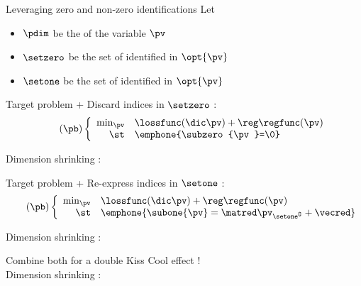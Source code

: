 \begin{frame}{Leveraging zero and non-zero identifications}
  Let
  \begin{itemize}
    \item $\pdim$ be the  of the variable $\pv$
    \pause
    \item $\setzero$ be the set of  identified in $\opt{\pv}$ 
    \pause
    \item $\setone$ be the set of  identified in $\opt{\pv}$ 
  \end{itemize}
  \pause
  \begin{minipage}{0.49\linewidth}
    \begin{block}{Target problem + \emphone{$\setzero$}}
      Discard indices in $\setzero$ :
      \begin{equation}
        \label{prob:convex-sparse-problem-zero}
        \tag{$\pb$}
        \left\{
          \begin{array}{rl}
            \min_{\pv} & \lossfunc(\dic\pv) + \reg\regfunc(\pv) \\
            \text{\st} & \emphone{\subzero{\pv}=\0}
          \end{array}
        \right.
      \end{equation}
      \pause
      \begin{center}
        Dimension shrinking : \emphone{$\pdim \rightarrow \pdim - \card{\setzero}$}
      \end{center}
    \end{block}
  \end{minipage}
  \pause
  \begin{minipage}{0.49\linewidth}
    \begin{block}{Target problem + \emphone{$\setone$}}
      Re-express indices in $\setone$ :
      \begin{equation}
        \label{prob:convex-sparse-problem-nonzero}
        \tag{$\pb$}
        \left\{
          \begin{array}{rl}
            \min_{\pv} & \lossfunc(\dic\pv) + \reg\regfunc(\pv) \\
            \text{\st} & \emphone{\subone{\pv}=\matred\pv_{\setone^\complement} + \vecred}
          \end{array}
        \right.
      \end{equation}
      \pause
      \begin{center}
        Dimension shrinking : \emphone{$\pdim \rightarrow \pdim - \card{\setone}$}
      \end{center}
    \end{block}
  \end{minipage}
  \pause
  \begin{center}
    Combine both for a double Kiss Cool effect ! \\
    Dimension shrinking : \emphone{$\pdim \rightarrow \pdim - \card{\setzero} - \card{\setone}$}
  \end{center}
\end{frame}

